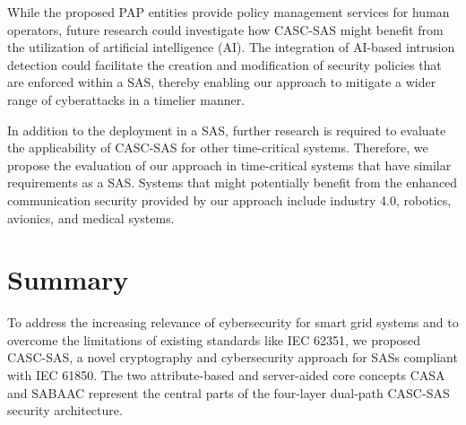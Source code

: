 While the proposed PAP entities provide policy management services for human operators, future research could investigate how CASC-SAS might benefit from the utilization of artificial intelligence (AI).
The integration of AI-based intrusion detection could facilitate the creation and modification of security policies that are enforced within a SAS, thereby enabling our approach to mitigate a wider range of cyberattacks in a timelier manner.

In addition to the deployment in a SAS, further research is required to evaluate the applicability of CASC-SAS for other time-critical systems.
Therefore, we propose the evaluation of our approach in time-critical systems that have similar requirements as a SAS.
Systems that might potentially benefit from the enhanced communication security provided by our approach include industry 4.0, robotics, avionics, and medical systems.

\section{Summary}
\label{sec:conclusion:summary}
To address the increasing relevance of cybersecurity for smart grid systems and to overcome the limitations of existing standards like IEC 62351, we proposed CASC-SAS, a novel cryptography and cybersecurity approach for SASs compliant with IEC 61850.
The two attribute-based and server-aided core concepts CASA and SABAAC represent the central parts of the four-layer dual-path CASC-SAS security architecture.

